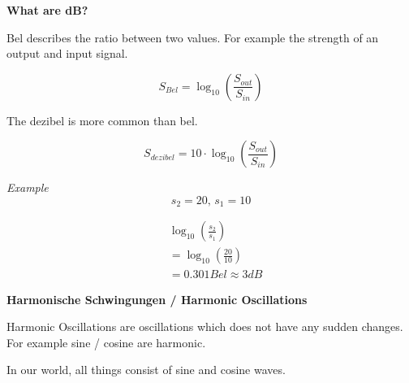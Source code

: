 \documentclass[11pt,twoside,twocolumn,landscape]{article}
\begin{document}
\textbf{What are dB?}

Bel describes the ratio between two values.
For example the strength of an output and input signal.

\begin{equation}
S_{Bel} = \log_{10}(\frac{S_{out}}{S_{in}})
\end{equation}

The dezibel is more common than bel.

\begin{equation}
S_{dezibel} = 10 \cdot \log_{10}(\frac{S_{out}}{S_{in}})
\end{equation}

\emph{Example}
\begin{equation}
s_2 = 20,\, s_1 = 10
\end{equation}

\begin{align}
&  \log_{10}(\frac{s_2}{s_1}) \\
&= \log_{10}(\frac{20}{10}) \\
&= 0.301Bel \approx 3 dB
\end{align}

\textbf{Harmonische Schwingungen / Harmonic Oscillations}

Harmonic Oscillations are oscillations which does not have any sudden changes.
For example sine / cosine are harmonic.

In our world, all things consist of sine and cosine waves.
\end{document}
